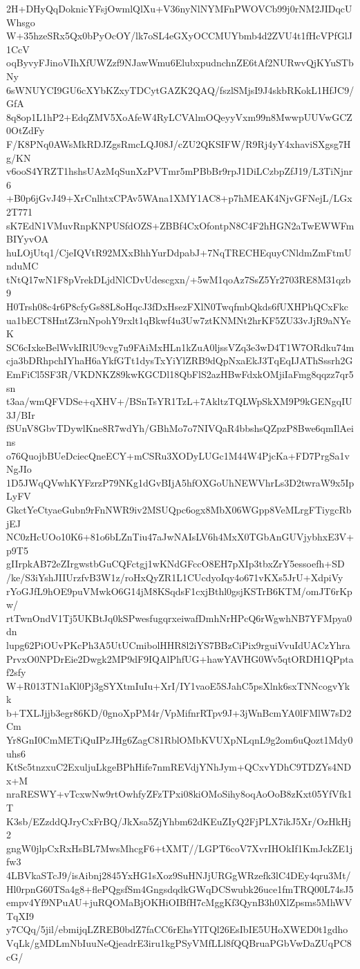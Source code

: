 2H+DHyQqDoknicYFsjOwmlQlXu+V36nyNlNYMFnPWOVCb99j0rNM2JIDqcUWhsgo
W+35hzeSRx5Qx0bPyOcOY/lk7oSL4eGXyOCCMUYbmb4d2ZVU4t1fHcVPfGlJ1CcV
oqByvyFJinoVIhXfUWZzf9NJawWmu6ElubxpudnchnZE6tAf2NURwvQjKYuSTbNy
6sWNUYCI9GU6cXYbKZxyTDCytGAZK2QAQ/fszlSMjsI9J4skbRKokL1HfJC9/GfA
8q8op1L1hP2+EdqZMV5XoAfeW4RyLCVAlmOQeyyVxm99n8MwwpUUVwGCZ0OtZdFy
F/K8PNq0AWsMkRDJZgsRmcLQJ08J/cZU2QKSIFW/R9Rj4yY4xhaviSXgsg7Hg/KN
v6ooS4YRZT1hshsUAzMqSunXzPVTmr5mPBbBr9rpJ1DiLCzbpZfJ19/L3TiNjnr6
+B0p6jGvJ49+XrCnlhtxCPAv5WAna1XMY1AC8+p7hMEAK4NjvGFNejL/LGx2T771
sK7EdN1VMuvRnpKNPUSfdOZS+ZBBf4CxOfontpN8C4F2hHGN2aTwEWWFmBIYyvOA
huLOjUtq1/CjeIQVtR92MXxBhhYurDdpabJ+7NqTRECHEquyCNldmZmFtmUnduMC
tNtQ17wN1F8pVrekDLjdNlCDvUdescgxn/+5wM1qoAz7SsZ5Yr2703RE8M31qzb9
H0Trsh08c4r6P8cfyGs88L8oHqcJ3fDxHsezFXlN0TwqfmbQkds6fUXHPhQCxFkc
ua1bECT8HntZ3rnNpohY9rxlt1qBkwf4u3Uw7ztKNMNt2hrKF5ZU33vJjR9aNYeK
SC6cIxkeBelWvkIRlU9cvg7u9FAiMxHLn1kZuA0ljssVZq3e3wD4T1W7ORdku74m
cja3bDRhpchIYhaH6aYkfGTt1dysTxYiYlZRB9dQpNxaEkJ3TqEqIJAThSssrh2G
EmFiCl5SF3R/VKDNKZ89kwKGCDl18QbFlS2azHBwFdxkOMjiIaFmg8qqzz7qr5sn
t3aa/wmQFVDSe+qXHV+/BSnTsYR1TzL+7AkltzTQLWpSkXM9P9kGENgqIU3J/BIr
fSUnV8GbvTDywlKne8R7wdYh/GBhMo7o7NIVQaR4bbshsQZpzP8Bwe6qmIlAeins
o76QuojbBUeDciecQneECY+mCSRu3XODyLUGc1M44W4PjcKa+FD7PrgSa1vNgJIo
1D5JWqQVwhKYFzrzP79NKg1dGvBIjA5hfOXGoUhNEWVhrLs3D2twraW9x5IpLyFV
GkctYeCtyaeGubn9rFnNWR9iv2MSUQpc6ogx8MbX06WGpp8VeMLrgFTiygcRbjEJ
NC0zHcUOo10K6+81o6bLZnTiu47aJwNAIsLV6h4MxX0TGbAnGUVjybhxE3V+p9T5
gIIrpkAB72eZIrgwstbGuCQFctgj1wKNdGFccO8EH7pXIp3tbxZrY5essoefh+SD
/ke/S3iYshJIIUrzfvB3W1z/roHxQyZR1L1CUcdyoIqy4o671vKXs5JrU+XdpiVy
rYoGJfL9hOE9puVMwkO6G14jM8KSqdsF1cxjBthl0gsjKSTrB6KTM/omJT6rKpw/
rtTwnOndV1Tj5UKBtJq0kSPwesfugqrxeiwafDmhNrHPcQ6rWgwhNB7YFMpya0dn
lupg62PiOUvPKcPh3A5UtUCmibolHHR8l2iYS7BBzCiPix9rguiVvuIdUACzYhra
PrvxO0NPDrEie2Dwgk2MP9dF9IQAlPhfUG+hawYAVHG0Wv5qtORDH1QPptaf2sfy
W+R013TN1aKl0Pj3gSYXtmIuIu+XrI/IY1vaoE5SJahC5psXlnk6sxTNNcogvYkk
b+TXLJjjb3egr86KD/0gnoXpPM4r/VpMifnrRTpv9J+3jWnBcmYA0lFMlW7sD2Cm
Yr8GnI0CmMETiQuIPzJHg6ZagC81RblOMbKVUXpNLqnL9g2om6uQozt1Mdy0uhs6
KtSc5tnzxuC2ExuljuLkgeBPhHife7nmREVdjYNhJym+QCxvYDhC9TDZYs4NDx+M
nraRESWY+vTcxwNw9rtOwhfyZFzTPxi08kiOMoSihy8oqAoOoB8zKxt05YfVfk1T
K3sb/EZzddQJryCxFrBQ/JkXsa5ZjYhbm62dKEuZIyQ2FjPLX7ikJ5Xr/OzHkHj2
gngW0jlpCxRxHsBL7MwsMhcgF6+tXMT//LGPT6coV7XvrIHOkIf1KmJckZE1jfw3
4LBVkaSTcJ9/isAibnj2845YxHG1sXoz9SuHNJjURGgWRzefk3lC4DEy4qru3Mt/
Hl0rpnG60TSa4g8+flePQgsfSm4GngsdqdkGWqDCSwubk26uce1fmTRQ00L74sJ5
empv4Yf9NPuAU+juRQOMaBjOKHiOIBfH7cMggKf3QynB3h0XlZpsms5MhWVTqXI9
y7CQq/5jil/ebmijqLZREB0bdZ7faCC6rEhsYlTQl26EsIbIE5UHoXWED0t1gdho
VqLk/gMDLmNbIuuNeQjeadrE3iru1kgPSyVMfLLl8fQQBruaPGbVwDaZUqPC8cG/

